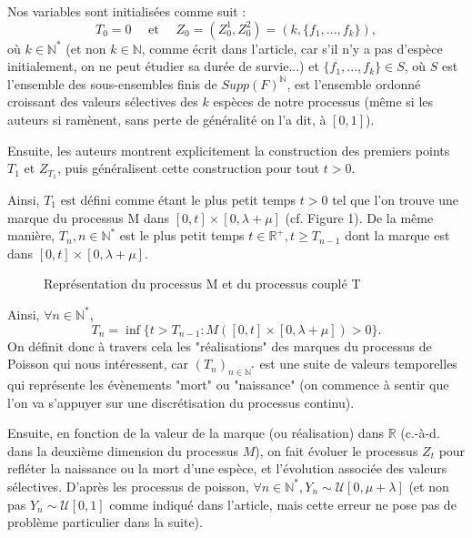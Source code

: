\documentclass[12pt,a4paper]{article}
\begin{document}
Nos variables sont initialisées comme suit : 
$$ T_0=0 \quad \text{ et } \quad Z_0=(Z_0^1, Z_0^2)=(k, \{f_1,...,f_k\}), $$ où $k \in \mathbb{N}^*$ (et non $k \in \mathbb{N}$, comme écrit dans l'article, car s'il n'y a pas d'espèce initialement, on ne peut étudier sa durée de survie...) et $\{f_1,...,f_k\} \in S$,  où $S$ est l'ensemble des sous-ensembles finis de $Supp(F)^\mathbb{N}$, est l'ensemble ordonné croissant des valeurs sélectives des $k$ espèces de notre processus (même si les auteurs si ramènent, sans perte de généralité on l'a dit, à $[0,1]$). \par 

Ensuite, les auteurs montrent explicitement la construction des premiers points $T_1$ et $Z_{T_1}$, puis généralisent cette construction pour tout $t>0$. \par 

Ainsi, $T_1$ est défini comme étant le plus petit temps $t > 0$ tel que l'on trouve une marque du processus M dans $[0,t] \times [0, \lambda+\mu]$ (cf. Figure 1). De la même manière, $T_n, n \in\mathbb{N}^*$ est le plus petit temps $t\in\mathbb{R}^+, t \geq T_{n-1}$ dont la marque est dans $[0,t] \times [0, \lambda+\mu]$. \par 

\begin{figure}[htp]
    \caption{\label{fig : my-label} Représentation du processus M et du processus couplé T}
  \end{figure}


Ainsi, $\forall n \in \mathbb{N}^*$, $$T_n = \inf \{ t>T_{n-1} : M([0,t] \times [0, \lambda+\mu])>0 \}. $$On définit donc à travers cela les "réalisations" des marques du processus de Poisson qui nous intéressent, car $(T_n)_{n \in \mathbb{N}^*}$ est une suite de valeurs temporelles qui représente les évènements "mort" ou "naissance" (on commence à sentir que l'on va s'appuyer sur une discrétisation du processus continu).\par 

Ensuite, en fonction de la valeur de la marque (ou réalisation) dans $\mathbb{R}$ (c.-à-d. dans la deuxième dimension du processus $M$), on fait évoluer le processus $Z_t$ pour refléter la naissance ou la mort d'une espèce, et l'évolution associée des valeurs sélectives. D'après les processus de poisson, $\forall n \in \mathbb{N}^*, Y_n \sim \mathcal{U}[0, \mu + \lambda]$ (et non pas $Y_n \sim \mathcal{U}[0, 1]$ comme indiqué dans l'article, mais cette erreur ne pose pas de problème particulier dans la suite).  \par 
\end{document}

